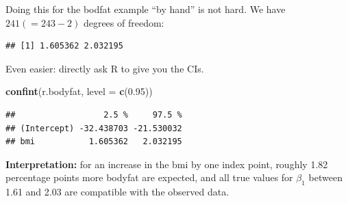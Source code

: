 \documentclass[10pt,ignorenonframetext,]{beamer}
\newenvironment{Shaded}{\begin{snugshade}}{\end{snugshade}}
\newcommand{\KeywordTok}[1]{\textcolor[rgb]{0.13,0.29,0.53}{\textbf{#1}}}
\newcommand{\DataTypeTok}[1]{\textcolor[rgb]{0.13,0.29,0.53}{#1}}
\newcommand{\DecValTok}[1]{\textcolor[rgb]{0.00,0.00,0.81}{#1}}
\newcommand{\FloatTok}[1]{\textcolor[rgb]{0.00,0.00,0.81}{#1}}
\newcommand{\StringTok}[1]{\textcolor[rgb]{0.31,0.60,0.02}{#1}}
\newcommand{\OperatorTok}[1]{\textcolor[rgb]{0.81,0.36,0.00}{\textbf{#1}}}
\newcommand{\NormalTok}[1]{#1}
\begin{document}
\begin{frame}[fragile]

Doing this for the bodfat example ``by hand'' is not hard. We have
\(241 (=243-2)\) degrees of freedom:

\begin{Shaded}
\end{Shaded}

\begin{verbatim}
## [1] 1.605362 2.032195
\end{verbatim}

\end{frame}

\begin{frame}[fragile]

Even easier: directly ask R to give you the CIs.

\begin{Shaded}
\begin{Highlighting}[]
\KeywordTok{confint}\NormalTok{(r.bodyfat, }\DataTypeTok{level =} \KeywordTok{c}\NormalTok{(}\FloatTok{0.95}\NormalTok{))}
\end{Highlighting}
\end{Shaded}

\begin{verbatim}
##                  2.5 %     97.5 %
## (Intercept) -32.438703 -21.530032
## bmi           1.605362   2.032195
\end{verbatim}

\textbf{Interpretation:} for an increase in the bmi by one index point,
roughly 1.82 percentage points more bodyfat are expected, and all true
values for \(\beta_1\) between 1.61 and 2.03 are compatible with the
observed data.

\end{frame}
\end{document}
